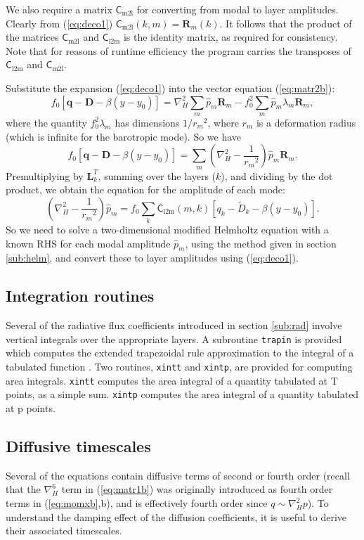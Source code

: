 \documentclass[11pt, a4paper,twoside]{article}
\newcommand{\rdm}[0]{{r_m}}
\newcommand{\vc}[1]{\mathbf{#1}}
\newcommand{\mtx}[1]{\vc{\mathsf{#1}}}
\newcommand{\cml}[0]{\mtx{C}_{\mathrm{m2l}}}
\newcommand{\clm}[0]{\mtx{C}_{\mathrm{l2m}}}
\newcommand{\Dt}[1]{\vc{{}^{#1}\vc{D}}}
\numberwithin{equation}{section}
\begin{document}
We also require a matrix $\cml$ for converting from modal to layer
amplitudes.
Clearly from (\ref{eq:deco1}) $\cml (k,m) =  \vc{R}_m(k)$.
It follows that the product of the matrices $\cml$ and $\clm$  is the identity matrix, as required for consistency.
Note that  for reasons of runtime efficiency the program carries the transposes of  $\clm$ and $\cml$.

Substitute the expansion (\ref{eq:deco1}) into the vector equation (\ref{eq:matr2b}):
\begin{equation}\label{eq:matr2c}
f_0 [\vc{q} -\Dt{} - \beta(y-y_0) ] =  \nabla_H^2  \sum_m \hat{p}_m  \vc{R}_m  - f_0^2 \sum_m \hat{p}_m  \lambda_m \vc{R}_m,
\end{equation}
where the quantity $f_0^2 \lambda_m$ has dimensions $1/\rdm^2$, where $\rdm$ is a
deformation radius (which is infinite for the barotropic mode).
So we have
\begin{equation}\label{eq:matr2d}
f_0 [\vc{q} -\Dt{} - \beta(y-y_0)  ] =  \sum_m \left(\nabla_H^2   - \frac{1}{\rdm^2} \right) \hat{p}_m \vc{R}_m.
\end{equation}
Premultiplying by $\vc{L}^T_k$, summing over the layers ($k$), and dividing by the dot product, we obtain the equation for the amplitude of each mode:
\begin{equation}\label{eq:matr2e}
\left(\nabla_H^2   - \frac{1}{\rdm^2} \right) \hat{p}_m = f_0 \sum_k \clm(m,k) [q_k -\tilde{D}_k - \beta(y-y_0) ].
\end{equation}
So we need to solve a two-dimensional modified Helmholtz equation with a known RHS for each modal amplitude $\hat{p}_m$, using the method given in section \ref{sub:helm}, and convert these to layer amplitudes using (\ref{eq:deco1}).


\subsection{Integration routines}
Several of the radiative flux coefficients introduced in section \ref{sub:rad} involve vertical integrals over the appropriate layers.
A subroutine \verb=trapin= is provided which computes the extended trapezoidal rule approximation to the integral of a tabulated function \citep{press:92}.
Two routines, \verb=xintt= and \verb=xintp=, are provided for computing area integrals.
\verb=xintt= computes the area integral of a quantity tabulated at T points, as a simple sum.
\verb=xintp= computes the area integral of a quantity tabulated at p points.

\subsection{Diffusive timescales}
Several of the equations contain diffusive terms of second or fourth order (recall that the $\nabla_H^6$ term in (\ref{eq:matr1b}) was originally introduced as fourth order terms in (\ref{eq:momxb},b), and is effectively fourth order since $q \sim \nabla_H^2p$).
To understand the damping effect of the diffusion coefficients, it is useful to derive their associated timescales.
\end{document}
